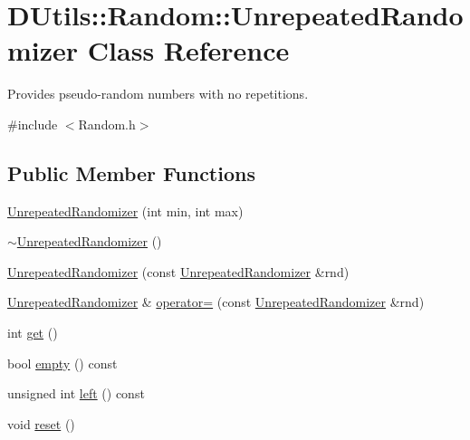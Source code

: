 \hypertarget{class_d_utils_1_1_random_1_1_unrepeated_randomizer}{}\section{D\+Utils\+:\+:Random\+:\+:Unrepeated\+Randomizer Class Reference}
\label{class_d_utils_1_1_random_1_1_unrepeated_randomizer}


Provides pseudo-\/random numbers with no repetitions.  




{\ttfamily \#include $<$Random.\+h$>$}

\subsection*{Public Member Functions}
\begin{DoxyCompactItemize}
\item 
\mbox{\hyperlink{class_d_utils_1_1_random_1_1_unrepeated_randomizer_ae073cba77da776dae607f22fd289b220}{Unrepeated\+Randomizer}} (int min, int max)
\item 
\mbox{\hyperlink{class_d_utils_1_1_random_1_1_unrepeated_randomizer_a8d523a848ff349c73da7499167c2c637}{$\sim$\+Unrepeated\+Randomizer}} ()
\item 
\mbox{\hyperlink{class_d_utils_1_1_random_1_1_unrepeated_randomizer_af4d4b9621cb9a55ec59fb311798a3a5b}{Unrepeated\+Randomizer}} (const \mbox{\hyperlink{class_d_utils_1_1_random_1_1_unrepeated_randomizer}{Unrepeated\+Randomizer}} \&rnd)
\item 
\mbox{\hyperlink{class_d_utils_1_1_random_1_1_unrepeated_randomizer}{Unrepeated\+Randomizer}} \& \mbox{\hyperlink{class_d_utils_1_1_random_1_1_unrepeated_randomizer_a18f74b44fe6747fa3498bdbe6422648e}{operator=}} (const \mbox{\hyperlink{class_d_utils_1_1_random_1_1_unrepeated_randomizer}{Unrepeated\+Randomizer}} \&rnd)
\item 
int \mbox{\hyperlink{class_d_utils_1_1_random_1_1_unrepeated_randomizer_ae1bf6a140e322962f65b2c98dc07a3ac}{get}} ()
\item 
bool \mbox{\hyperlink{class_d_utils_1_1_random_1_1_unrepeated_randomizer_a4f93a3ab99e3e801d0c1d2599917a37a}{empty}} () const
\item 
unsigned int \mbox{\hyperlink{class_d_utils_1_1_random_1_1_unrepeated_randomizer_a8ba0925ac2e14881505a9575466ddc4f}{left}} () const
\item 
void \mbox{\hyperlink{class_d_utils_1_1_random_1_1_unrepeated_randomizer_a315e00744de8bb3794d154797d02ec1f}{reset}} ()
\end{DoxyCompactItemize}
